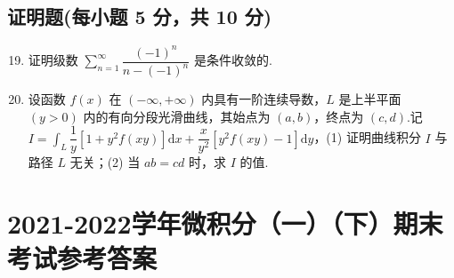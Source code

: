 \documentclass[../main.tex]{subfiles}
\begin{document}
\section{证明题(每小题 5 分，共 10 分)}

\begin{enumerate}
    \setcounter{enumi}{18}
    \item 证明级数 \( \sum \limits_{n=1}^{\infty} \dfrac{(-1)^n}{n - (-1)^n} \) 是条件收敛的.
          \vspace{10em}

    \item 设函数 \( f(x) \) 在 \( (-\infty, +\infty) \) 内具有一阶连续导数，\( L \) 是上半平面 \( (y > 0) \) 内的有向分段光滑曲线，其始点为 \( (a, b) \)，终点为 \( (c, d) \).记 \( I = \displaystyle \int_L \dfrac{1}{y}[1 + y^2 f(xy)]\mathrm{d}x + \dfrac{x}{y^2}[y^2 f(xy) - 1]\mathrm{d}y \)，(1) 证明曲线积分 \( I \) 与路径 \( L \) 无关；(2) 当 \( ab = cd \) 时，求 \( I \) 的值.
          \vspace{10em}
\end{enumerate}
\chapter{2021-2022学年微积分（一）（下）期末考试参考答案}
\end{document}
